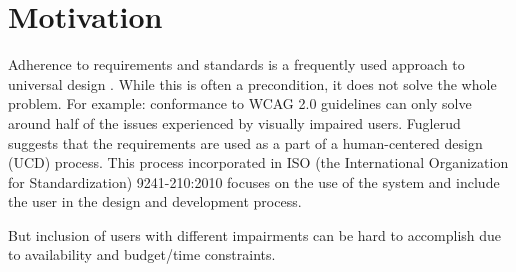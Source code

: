 \section{Motivation}
Adherence to requirements and standards is a frequently used approach to universal design \parencite{fuglerud_link_2013}. While this is often a precondition, it does not solve the whole problem. For example: conformance to WCAG 2.0 guidelines can only solve around half of the issues experienced by visually impaired users. Fuglerud suggests that the requirements are used as a part of a human-centered design (UCD) process. This process incorporated in ISO (the International Organization for Standardization) 9241-210:2010 focuses on the use of the system and include the user in the design and development process.

But inclusion of users with different impairments can be hard to accomplish due to availability and budget/time constraints.











